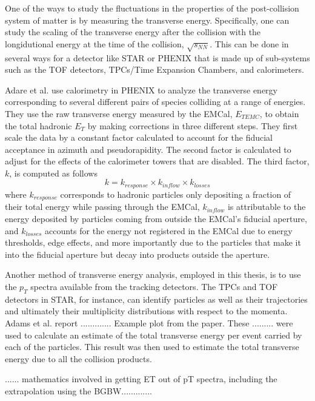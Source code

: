 One of the ways to study the fluctuations in the properties of the post-collision system of matter is by measuring the transverse energy. Specifically, one can study the scaling of the transverse energy after the collision with the longidutional energy at the time of the collision, $\sqrt{s_{NN}}$. This can be done in several ways for a detector like STAR or PHENIX that is made up of sub-systems such as the TOF detectors, TPCs/Time Expansion Chambers, and calorimeters. 

Adare et al. \cite{Adare:2015bua} use calorimetry in PHENIX to analyze the transverse energy corresponding to several different pairs of species colliding at a range of energies. They use the raw transverse energy measured by the EMCal, $E_{{T}EMC}$, to obtain the total hadronic $E_{T}$ by making corrections in three different steps. They first scale the data by a constant factor calculated to account for the fiducial acceptance in azimuth and pseudorapidity. The second factor is calculated to adjust for the effects of the calorimeter towers that are disabled. The third factor, $k$, is computed as follows
\begin{equation}\label{eqn:AdareKfactor}
k = k_{response} \times k_{inflow} \times k_{losses}
\end{equation}
where $k_{response}$ corresponds to hadronic particles only depositing a fraction of their total energy while passing through the EMCal, $k_{inflow}$ is attributable to the energy deposited by particles coming from outside the EMCal's fiducial aperture, and $k_{losses}$ accounts for the energy not registered in the EMCal due to energy thresholds, edge effects, and more importantly due to the particles that make it into the fiducial aperture but decay into products outside the aperture.

Another method of transverse energy analysis, employed in this thesis, is to use the $p_{T}$ spectra available from the tracking detectors. The TPCs and TOF detectors in STAR, for instance, can identify particles as well as their trajectories and ultimately their multiplicity distributions with respect to the momenta. Adams et al. \cite{Adams:2004cb} report ............. Example plot from the paper. These ......... were used to calculate an estimate of the total transverse energy per event carried by each of the particles. This result was then used to estimate the total transverse energy due to all the collision products.

...... mathematics involved in getting ET out of pT spectra, including the extrapolation using the BGBW.............

